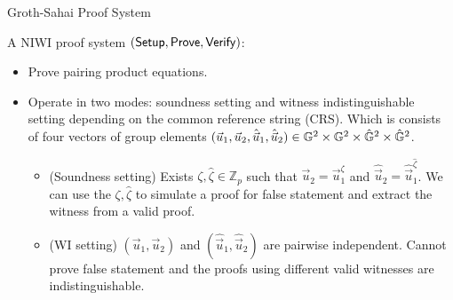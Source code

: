 \begin{frame}{Groth-Sahai Proof System}

  A NIWI proof system $({\mathsf{Setup}}, {\mathsf{Prove}}, {\mathsf{Verify}})$:
  \pause
  \begin{itemize}
  \item Prove pairing product equations.
    \pause
  \item {\color{blue}Operate in two modes}: soundness setting and witness indistinguishable setting depending on the common reference string (CRS). Which is consists of four vectors of group elements $(\vec{u}_1, \vec{u}_2, \hat{\vec{u}}_1, \hat{\vec{u}}_2) \in \mathbb{G}^2 \times \mathbb{G}^2 \times \hat{\mathbb{G}}^2 \times \hat{\mathbb{G}}^2$.
    \pause
  	\begin{itemize}
  	\item  {\color{blue}(Soundness setting)} Exists $\zeta, \hat{\zeta} \in \mathbb{Z}_p$ such that $\vec{u}_2 = \vec{u}_1^\zeta$ and $\hat{\vec{u}}_2 = \hat{\vec{u}}_1^{\hat{\zeta}}$. We can use the $\zeta, \hat{\zeta}$ to simulate a proof for false statement and extract the witness from a valid proof.
          \pause
  	\item {\color{blue}(WI setting)} $(\vec{u}_1, \vec{u}_2)$ and $(\hat{\vec{u}}_1,  \hat{\vec{u}}_2)$ are pairwise independent. Cannot prove false statement and the proofs using different valid witnesses are indistinguishable.
  	\end{itemize}
  \end{itemize}
  
\end{frame}





